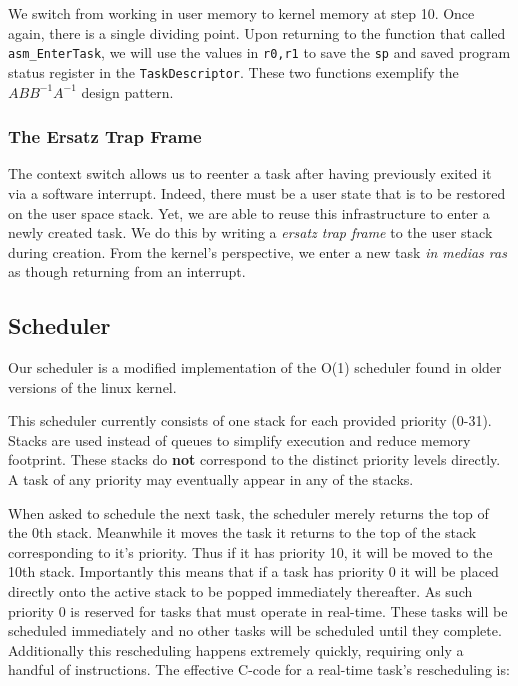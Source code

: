 \documentclass{article}
\begin{document}
We switch from working in user memory to kernel memory at step 10. Once again,
there is a single dividing point. Upon returning to the function that called
\texttt{asm\_EnterTask}, we will use the values in \texttt{r0,r1} to save the
\texttt{sp} and saved program status register in the \texttt{TaskDescriptor}.
These two functions exemplify the $ABB^{-1}A^{-1}$ design pattern.

\subsubsection{The Ersatz Trap Frame}

The context switch allows us to reenter a task after having previously exited it
via a software interrupt. Indeed, there must be a user state that is to be
restored on the user space stack. Yet, we are able to reuse this infrastructure
to enter a newly created task. We do this by writing a \textit{ersatz trap
frame} to the user stack during creation. From the kernel's perspective, we
enter a new task \textit{in medias ras} as though returning from an interrupt.

\subsection{Scheduler}

Our scheduler is a modified implementation of the O(1) scheduler found in older
versions of the linux kernel.

This scheduler currently consists of one stack for each provided priority
(0-31). Stacks are used instead of queues to simplify execution and reduce
memory footprint. These stacks do \textbf{not} correspond to the distinct
priority levels directly. A task of any priority may eventually appear in any of
the stacks.

When asked to schedule the next task, the scheduler merely returns the top of
the 0th stack. Meanwhile it moves the task it returns to the top of the stack
corresponding to it's priority. Thus if it has priority 10, it will be moved to
the 10th stack. Importantly this means that if a task has priority 0 it will be
placed directly onto the active stack to be popped immediately thereafter. As
such priority 0 is reserved for tasks that must operate in real-time. These
tasks will be scheduled immediately and no other tasks will be scheduled until
they complete. Additionally this rescheduling happens extremely quickly,
requiring only a handful of instructions. The effective C-code for a real-time
task's rescheduling is:
\end{document}
